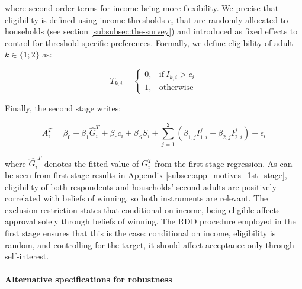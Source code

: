 \documentclass[11pt]{article}
\begin{document}
\noindent
where second order terms for income bring more flexibility. We precise that eligibility is defined using income thresholds $c_i$ that are randomly allocated to households (see section \ref{subsubsec:the-survey}) and introduced as fixed effects to control for threshold-specific preferences. Formally, we define eligibility of adult $k\in \{1;2\}$ as:

\begin{equation}
T_{k,i} =
\begin{cases}
  0, & \text{if}\ I_{k,i} > c_i \\
  1, & \text{otherwise}
\end{cases}
\end{equation}

\medskip

\noindent
Finally, the second stage writes:

\begin{equation}
    A_i^T = \beta_0 + \beta_1 \widehat{G}_i^T + \beta_c c_i + \beta_S S_i + \sum_{j=1}^2 \left( \beta_{1,j} I_{1,i}^j + \beta_{2,j} I_{2,i}^j \right) + \epsilon_i
    \label{eq:second_stage_with_rdd_approve_winner}
\end{equation}

\medskip

\noindent
where $\widehat{G_i}^T$ denotes the fitted value of $G_i^T$ from the first stage regression. As can be seen from first stage results in Appendix \ref{subsec:app_motives_1st_stage}, eligibility of both respondents and households' second adults are positively correlated with beliefs of winning, so both instruments are relevant. The exclusion restriction states that conditional on income, being eligible affects approval solely through beliefs of winning. The RDD procedure employed in the first stage ensures that this is the case: conditional on income, eligibility is random, and controlling for the target, it should affect acceptance only through self-interest.

\paragraph{Alternative specifications for robustness}
\end{document}
